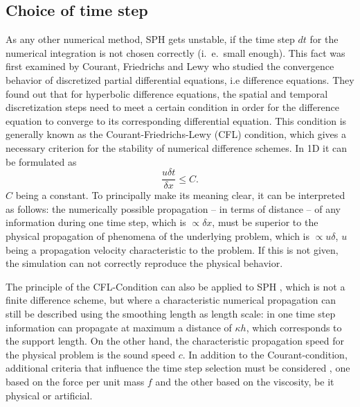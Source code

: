 \documentclass{report}
\begin{document}
\subsection{Choice of time step}
\label{sec:TmeStepChoice}
As any other numerical method, SPH gets unstable, if the time step $dt$ for the numerical integration is not chosen correctly (i.\ e.\ small enough). 
This fact was first examined by Courant, Friedrichs and Lewy \cite{Courant1928} who studied the convergence behavior of discretized partial differential equations, i.e difference equations. They found out that for hyperbolic difference equations, the spatial and temporal discretization steps need to meet a certain condition in order for the difference equation to converge to its  corresponding differential equation. This condition is generally known as the Courant-Friedrichs-Lewy (CFL) condition, which gives a necessary criterion for the stability of numerical difference schemes.
In 1D it can be formulated as
\begin{equation}
 \frac{u\delta t}{\delta x}\leq C.
\end{equation}
$C$ being a constant.
To principally make its meaning clear, it can be interpreted as follows:
the numerically possible propagation -- in terms of distance -- of any information during one time step, which is $\propto\delta x$, must be superior to the physical propagation of phenomena of the underlying problem, which is $\propto u\delta$, $u$ being a propagation velocity characteristic to the problem. If this is not given, the simulation can not correctly reproduce the physical behavior. 

The principle of the CFL-Condition can also be applied to SPH \cite{Monaghan1989}, which is not a finite difference scheme, but where a characteristic numerical propagation can still be described using the smoothing length as length scale: in one time step information can propagate at maximum a distance of $\kappa h$, which corresponds to the support length. On the other hand, the characteristic propagation speed for the physical problem is the sound speed $c$. 
In addition to the Courant-condition, additional criteria that influence the time step selection must be considered \cite{Monaghan1992}, one based on the force per unit mass $f$ and the other based on the viscosity, be it physical or artificial.
\end{document}
